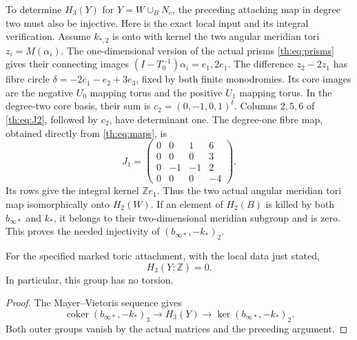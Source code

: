 To determine $H_3(Y)$ for $Y=W\cup_BN_c$, the preceding attaching map
in degree two must also be injective.
Here is the exact local input and its integral verification.
Assume $k_{*,2}$ is onto with kernel the two angular meridian tori
$z_i=M(\alpha_i)$.
The one-dimensional version of the actual prisms \eqref{th:eq:prisms}
gives their connecting images $(I-T_0^{-1})\alpha_i=e_1,2e_1$.
The difference $z_2-2z_1$ has fibre circle
$\delta=-2e_1-e_2+3e_3$, fixed by both finite monodromies.
Its core images are the negative $U_0$ mapping torus
and the positive $U_1$ mapping torus.
In the degree-two core basis, their sum is $c_2=(0,-1,0,1)^t$.
Columns $2,5,6$ of \eqref{th:eq:J2}, followed by $c_2$, have determinant one.
The degree-one fibre map, obtained directly from \eqref{th:eq:maps}, is
\[
J_1=\begin{pmatrix}0&0&1&6\\0&0&0&3\\0&-1&-1&2\\0&0&0&-4\end{pmatrix}.
\]
Its rows give the integral kernel $\mathbb Ze_1$.
Thus the two actual angular meridian tori map isomorphically onto $H_2(W)$.
If an element of $H_2(B)$ is killed by both $b_{\infty*}$ and $k_*$,
it belongs to their two-dimensional meridian subgroup and is zero.
This proves the needed injectivity of $(b_{\infty*},-k_*)_2$.

\begin{corollary}\label{th:cor:Y}
For the specified marked toric attachment, with the local data just stated,
\[
H_3(Y;\mathbb Z)=0.
\]
In particular, this group has no torsion.
\end{corollary}
\begin{proof}
The Mayer--Vietoris sequence gives
\[
\operatorname{coker}(b_{\infty*},-k_*)_3
\longrightarrow H_3(Y)
\longrightarrow\ker(b_{\infty*},-k_*)_2.
\]
Both outer groups vanish by the actual matrices and the preceding argument.
\end{proof}

